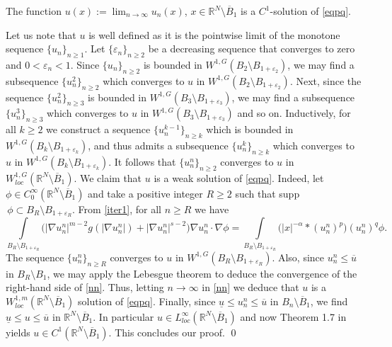 \documentclass[leqno,12pt]{article}
\numberwithin{equation}{section}
\newcommand{\Ro}{\mathbb R^N\setminus \overline B_1}
\begin{document}
\smallskip

 The function $u(x):=\lim_{n\to \infty}u_n(x)$, $x\in \Ro$ is a $C^1$-solution of \eqref{eqpq}.

Let us note that $u$ is well defined as it is the pointwise limit of the monotone sequence $\{u_n\}_{n\geq 1}$. Let $\{\varepsilon_n\}_{n\geq 2}$ be a decreasing sequence that converges to zero and $0<\varepsilon_n<1$. Since $\{u_n\}_{n\geq 2}$ is bounded in $W^{1, G}(B_2\setminus B_{1+\varepsilon_2})$, we may find a subsequence $\{u_n^2\}_{n\geq 2}$ which converges to $u$ in $W^{1, G}(B_2\setminus B_{1+\varepsilon_2})$. Next, since the sequence $\{u_n^2\}_{n\geq 3}$ is bounded in $W^{1, G}(B_3\setminus B_{1+\varepsilon_3})$, we may find a subsequence $\{u_n^3\}_{n\geq 3}$ which converges to $u$ in $W^{1, G}(B_3\setminus B_{1+\varepsilon_3})$ and so on. Inductively, for all $k\geq 2$ we construct a sequence  
$\{u_n^{k-1}\}_{n\geq k}$ which is bounded in $W^{1, G}(B_k\setminus B_{1+\varepsilon_k})$, and thus admits a subsequence $\{u_n^k\}_{n\geq k}$ which converges to $u$ in $W^{1, G}(B_k\setminus B_{1+\varepsilon_k})$. It follows that $\{u_n^n\}_{n\geq 2}$ converges to $u$ in $W^{1, G}_{loc}(\Ro)$. We claim that $u$ is a weak solution of \eqref{eqpq}. Indeed, let $\phi\in C_0^\infty(\Ro)$ and take a positive integer $R\geq 2$ such that supp$\,\phi\subset B_R\setminus B_{1+\varepsilon_R}$. From \eqref{iter1}, for all $n\geq R$ we have
\begin{equation}\label{nn}
\int\limits _{B_R\setminus B_{1+\varepsilon_R}}\Big(|\nabla u_n^n|^{m-2}g(|\nabla u_n^n|)+|\nabla u_n^n|^{s-2}\Big) \nabla u_n^n\cdot \nabla \phi = \int\limits _{B_R\setminus B_{1+\varepsilon_R}} \big(|x|^{-\alpha}*(u_n^n)^p\big)(u_n^n)^q \phi.
\end{equation}
The sequence $\{u_n^n\}_{n\geq R}$ converges to $u$ in $W^{1, G}(B_R\setminus B_{1+\varepsilon_R})$. Also, since $u_n^n\leq \overline u$ in $B_R\setminus B_1$, we may apply the Lebesgue theorem to deduce the convergence of the right-hand side of \eqref{nn}. Thus, letting $n\to \infty$ in \eqref{nn} we deduce that $u$ is a $W^{1, m}_{loc}(\Ro)$ solution of \eqref{eqpq}. Finally, since $\underline u\leq u_n^n\leq \overline u$ in $B_n\setminus \overline B_1$, we find $\underline u\leq u\leq \overline u$ in $\Ro$. In particular $u\in L^\infty_{loc}(\Ro)$ and now Theorem 1.7 in \cite{L91} yields $u\in C^1(\Ro)$. This concludes our proof.
\qed
\end{document}
